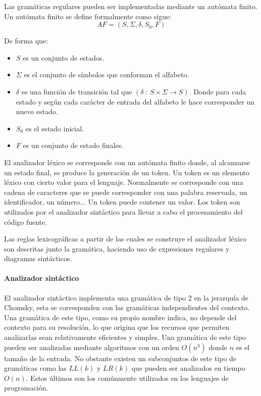 Las gramáticas regulares pueden ser implementadas mediante un autómata finito. Un autómata finito se define formalmente como sigue:
$$AF = (S,\Sigma,\delta,S_0,F)$$

De forma que:
\begin{itemize}
\item $S$ es un conjunto de estados.
\item $\Sigma$ es el conjunto de símbolos que conforman el alfabeto.
\item $\delta$ es una función de transición tal que $(\delta\ :\ S\times\Sigma \rightarrow S)$. Donde para cada estado y según 
cada carácter de entrada del alfabeto le hace corresponder un nuevo estado.
\item $S_0$ es el estado inicial.
\item $F$ es un conjunto de estado finales.
\end{itemize}

El analizador léxico se corresponde con un autómata finito donde, al alcanzarse un estado final, se produce la generación de un token.
Un token es un elemento léxico con cierto valor para el lenguaje. Normalmente se corresponde con una cadena de
caracteres que se puede corresponder con una palabra reservada, un identificador, un número... Un token puede contener un 
valor. Los token son utilizados por el analizador sintáctico para llevar a cabo el procesamiento del código fuente. 

Las reglas lexicográficas a partir de las cuales se construye el analizador léxico son descritas junto la gramática, haciendo uso
de expresiones regulares y diagramas sintácticos.

\paragraph{Analizador sintáctico}
El analizador sintáctico implementa una gramática de tipo 2 en la jerarquía de Chomsky, esta se corresponden con las 
gramáticas independientes del contexto. Una gramática de este tipo, como su propio nombre indica, no depende del contexto para
su resolución, lo que origina que los recursos que permiten analizarlas sean relativamente eficientes y simples. Una gramática de
este tipo pueden ser analizadas mediante algoritmos con un orden $O(n^3)$ donde $n$ es el tamaño de la entrada. No obstante existen 
un subconjuntos de este tipo de gramáticas como las $LL(k)$ y $LR(k)$ que pueden ser analizados en tiempo $O(n)$. Estos últimos son los
comúnmente utilizados en los lenguajes de programación.

